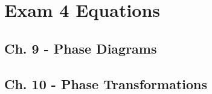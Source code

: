 \section{Exam 4 Equations}
	\subsection{Ch. 9 - Phase Diagrams}
	\subsection{Ch. 10 - Phase Transformations}